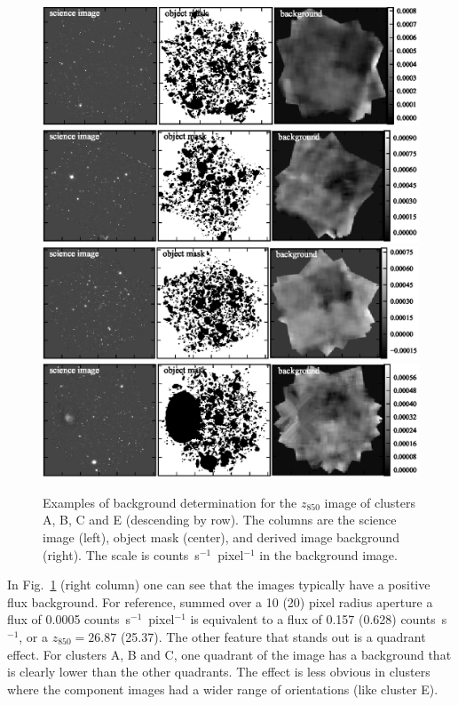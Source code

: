 \begin{figure}[tp]
\begin{center}
\includegraphics{figures/clrate/images_A.eps}
\includegraphics{figures/clrate/images_B.eps}
\includegraphics{figures/clrate/images_C.eps}
\includegraphics{figures/clrate/images_E.eps}
\end{center}
\caption[Image background determination examples]{Examples of background
  determination for the $z_{850}$ image of clusters A, B, C and E
  (descending by row). The columns are the science image (left),
  object mask (center), and derived image background (right). The
  scale is counts~s$^{-1}$~pixel$^{-1}$ in the background
  image.\label{fig:background}}
\end{figure}

In Fig.~\ref{fig:background} (right column) one can see that the
images typically have a positive flux background.  For reference,
summed over a 10 (20) pixel radius aperture a flux of 0.0005
counts~s$^{-1}$~pixel$^{-1}$ is equivalent to a flux of 0.157 (0.628)
counts~s$^{-1}$, or a $z_{850} = 26.87$ (25.37).  The other feature
that stands out is a quadrant effect. For clusters A, B and C, one
quadrant of the image has a background that is clearly lower than the
other quadrants. The effect is less obvious in clusters where the
component images had a wider range of orientations (like cluster E).

